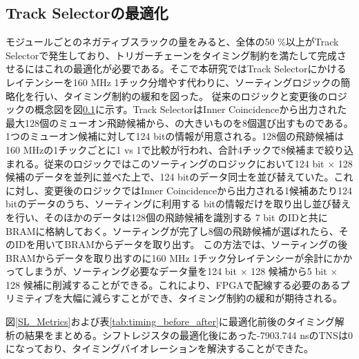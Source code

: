 \subsection{Track Selectorの最適化}
モジュールごとのネガティブスラックの量をみると、全体の50 \%以上がTrack Selectorで発生しており、トリガーチェーンをタイミング制約を満たして完成させるにはこれの最適化が必要である。そこで本研究ではTrack Selectorにかけるレイテンシーを160 MHz 1チック分増やす代わりに、ソーティングロジックの簡略化を行い、タイミング制約の緩和を図った。
従来のロジックと変更後のロジックの概念図を図\ref{}に示す。Track SelectorはInner Coincidenceから出力された最大128個のミューオン飛跡候補から、\pt の大きいものを8個選び出すものである。1つのミューオン候補に対して124 bitの情報が用意される。128個の飛跡候補は160 MHzの1チックごとに1 vs 1で\pt 比較が行われ、合計4チックで8候補まで絞り込まれる。従来のロジックではこのソーティングのロジックにおいて124 bit $\times$ 128 候補のデータを並列に並べた上で、124 bitのデータ同士を並び替えていた。これに対し、変更後のロジックではInner Coincidenceから出力される1候補あたり124 bitのデータのうち、ソーティングに利用する bitの情報だけを取り出し並び替えを行い、そのほかのデータは128個の飛跡候補を識別する 7 bit のIDと共にBRAMに格納しておく。ソーティングが完了し8個の飛跡候補が選ばれたら、そのIDを用いてBRAMからデータを取り出す。
この方法では、ソーティングの後BRAMからデータを取り出すのに160 MHz 1チック分レイテンシーが余計にかかってしまうが、ソーティング必要なデータ量を124 bit $\times$ 128 候補から5 bit $\times$ 128 候補に削減することができる。これにより、FPGAで配線する必要のあるプリミティブを大幅に減らすことができ、タイミング制約の緩和が期待される。

図\ref{SL_Metrics}および表\ref{tab:timing_before_after}に最適化前後のタイミング解析の結果をまとめる。シフトレジスタの最適化後にあった-7903.744 nsのTNSは0になっており、タイミングバイオレーションを解決することができた。


